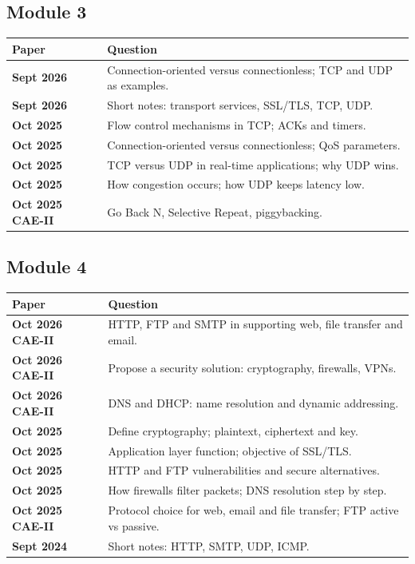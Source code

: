 \documentclass[11pt,a4paper]{article}
\begin{document}
\subsection{Module 3}

\begin{center}\small
\begin{tabularx}{\textwidth}{>{\bfseries}p{} X}
\toprule Paper & Question\\
\midrule
Sept 2026 & Connection-oriented versus connectionless; TCP and UDP as examples.\\
Sept 2026 & Short notes: transport services, SSL/TLS, TCP, UDP.\\
Oct 2025 & Flow control mechanisms in TCP; ACKs and timers.\\
Oct 2025 & Connection-oriented versus connectionless; QoS parameters.\\
Oct 2025 & TCP versus UDP in real-time applications; why UDP wins.\\
Oct 2025 & How congestion occurs; how UDP keeps latency low.\\
Oct 2025 CAE-II & Go Back N, Selective Repeat, piggybacking.\\
\bottomrule
\end{tabularx}
\end{center}

\subsection{Module 4}

\begin{center}\small
\begin{tabularx}{\textwidth}{>{\bfseries}p{} X}
\toprule Paper & Question\\
\midrule
Oct 2026 CAE-II & HTTP, FTP and SMTP in supporting web, file transfer and email.\\
Oct 2026 CAE-II & Propose a security solution: cryptography, firewalls, VPNs.\\
Oct 2026 CAE-II & DNS and DHCP: name resolution and dynamic addressing.\\
Oct 2025 & Define cryptography; plaintext, ciphertext and key.\\
Oct 2025 & Application layer function; objective of SSL/TLS.\\
Oct 2025 & HTTP and FTP vulnerabilities and secure alternatives.\\
Oct 2025 & How firewalls filter packets; DNS resolution step by step.\\
Oct 2025 CAE-II & Protocol choice for web, email and file transfer; FTP active vs passive.\\
Sept 2024 & Short notes: HTTP, SMTP, UDP, ICMP.\\
\bottomrule
\end{tabularx}
\end{center}
\end{document}
